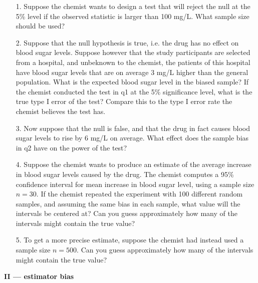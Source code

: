 \documentclass[10pt]{extarticle}
\begin{document}
\begin{itemize}

    \item[1.] Suppose the chemist wants to design a test that will reject the null at the 5\% level if the observed statistic is larger than 100 mg/L. What sample size should be used? \\ 
	
	\item[2.] Suppose that the null hypothesis is true, i.e. the drug has no effect on blood sugar levels. Suppose however that the study participants are selected from a hospital, and unbeknown to the chemist, the patients of this hospital have blood sugar levels that are on average 3 mg/L higher than the general population. What is the expected blood sugar level in the biased sample? If the chemist conducted the test in q1 at the 5\% significance level, what is the true type I error of the test? Compare this to the type I error rate the chemist believes the test has.  \\ 

	\item[3.] Now suppose that the null is false, and that the drug in fact causes blood sugar levels to rise by 6 mg/L on average. What effect does the sample bias in q2 have on the power of the test? \\ 

	\item[4.] Suppose the chemist wants to produce an estimate of the average increase in blood sugar levels caused by the drug. The chemist computes a 95\% confidence interval for mean increase in blood sugar level, using a sample size $n=30$. If the chemist repeated the experiment with 100 different random samples, and assuming the same bias in each sample, what value will the intervals be centered at? Can you guess approximately how many of the intervals might contain the true value? \\ 
	
	\item[5.] To get a more precise estimate, suppose the chemist had instead used a sample size $n=500$. Can you guess approximately how many of the intervals might contain the true value?   

\end{itemize}




\hfill 

{\Large \bf II --- estimator bias}  \\
\end{document}
